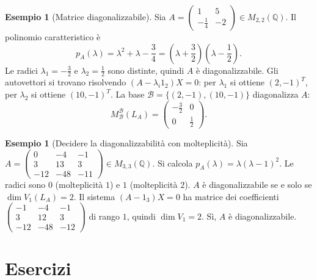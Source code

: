 \documentclass[11pt, a4paper]{book}
\theoremstyle{definition}
\newtheorem{esempio}[definizione]{Esempio}
\theoremstyle{plain}
\theoremstyle{remark}
\newcommand{\Q}{\mathbb{Q}}
\begin{document}
\begin{exbox}
\begin{esempio}[Matrice diagonalizzabile]
Sia $A = \begin{pmatrix}1 & 5\\ -\tfrac{1}{4} & -2\end{pmatrix} \in M_{2,2}(\Q)$. Il polinomio caratteristico è
\[
  p_A(\lambda) = \lambda^2 + \lambda - \frac{3}{4} = \left(\lambda + \frac{3}{2}\right)\left(\lambda - \frac{1}{2}\right).
\]
Le radici $\lambda_1 = -\tfrac{3}{2}$ e $\lambda_2 = \tfrac{1}{2}$ sono distinte, quindi $A$ è diagonalizzabile. Gli autovettori si trovano risolvendo $(A - \lambda_i 1_2)X = 0$: per $\lambda_1$ si ottiene $(2,-1)^T$, per $\lambda_2$ si ottiene $(10,-1)^T$. La base $\mathcal{B} = \{(2,-1),(10,-1)\}$ diagonalizza $A$:
\[
  M^{\mathcal{B}}_{\mathcal{B}}(L_A) = \begin{pmatrix}-\tfrac{3}{2}&0\\0&\tfrac{1}{2}\end{pmatrix}.
\]
\end{esempio}
\end{exbox}

\begin{exbox}
\begin{esempio}[Decidere la diagonalizzabilità con molteplicità]
Sia $A = \begin{pmatrix}0&-4&-1\\3&13&3\\-12&-48&-11\end{pmatrix} \in M_{3,3}(\Q)$. Si calcola $p_A(\lambda) = \lambda(\lambda-1)^2$. Le radici sono $0$ (molteplicità $1$) e $1$ (molteplicità $2$). $A$ è diagonalizzabile se e solo se $\dim V_1(L_A) = 2$. Il sistema $(A-1_3)X=0$ ha matrice dei coefficienti
$\begin{pmatrix}-1&-4&-1\\3&12&3\\-12&-48&-12\end{pmatrix}$
di rango $1$, quindi $\dim V_1 = 2$. Sì, $A$ è diagonalizzabile.
\end{esempio}
\end{exbox}

\section*{Esercizi}
\end{document}
